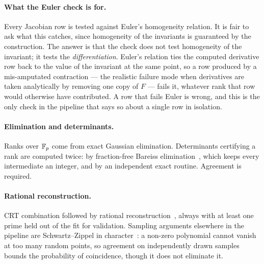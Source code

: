 \paragraph{What the Euler check is for.}
Every Jacobian row is tested against Euler's homogeneity relation. It is fair to
ask what this catches, since homogeneity of the invariants is guaranteed by the
construction. The answer is that the check does not test homogeneity of the
invariant; it tests the \emph{differentiation}. Euler's relation ties the
computed derivative row back to the value of the invariant at the same point, so
a row produced by a mis-amputated contraction --- the realistic failure mode when
derivatives are taken analytically by removing one copy of $F$ --- fails it,
whatever rank that row would otherwise have contributed. A row that fails Euler
is wrong, and this is the only check in the pipeline that says so about a single
row in isolation.

\paragraph{Elimination and determinants.}
Ranks over $\mathbb{F}_p$ come from exact Gaussian elimination. Determinants certifying a
rank are computed twice: by fraction-free Bareiss elimination~\cite{Bareiss:1968},
which keeps every intermediate an integer, and by an independent exact routine.
Agreement is required.

\paragraph{Rational reconstruction.}
CRT combination followed by rational reconstruction~\cite{Wang:1982}, always with
at least one prime held out of the fit for validation. Sampling arguments
elsewhere in the pipeline are Schwartz--Zippel in
character~\cite{Zippel:1979,Schwartz:1980}: a non-zero polynomial cannot vanish at
too many random points, so agreement on independently drawn samples bounds the
probability of coincidence, though it does not eliminate it.


